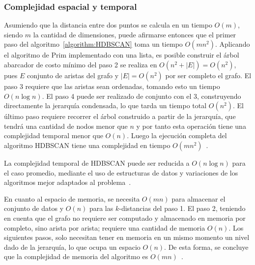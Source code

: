 \subsubsection{Complejidad espacial y temporal}

Asumiendo que la distancia entre dos puntos se calcula en un tiempo $O(m)$, siendo $m$ la cantidad de dimensiones, puede afirmarse entonces que el primer paso del algoritmo~\ref{algorithm:HDBSCAN} toma un tiempo $O(m n^2)$.
Aplicando el algoritmo de Prim implementado con una lista, es posible construir el árbol abarcador de costo mínimo del paso 2 se realiza en $O(n^2+|E|) = O(n^2)$, pues $E$ conjunto de aristas del grafo y $|E|=O(n^2)$ por ser completo el grafo.
El paso 3 requiere que las aristas sean ordenadas, tomando esto un tiempo $O(n\log n)$.
El paso 4 puede ser realizado de conjunto con el 3, construyendo directamente la jerarquía condensada, lo que tarda un tiempo total $O(n^2)$.
El último paso requiere recorrer el árbol construido a partir de la jerarquía, que tendrá una cantidad de nodos menor que $n$ y por tanto esta operación tiene una complejidad temporal menor que $O(n)$.
Luego la ejecución completa del algoritmo HDBSCAN tiene una complejidad en tiempo $O(m n^2)$~\cite{Campello15}.

La complejidad temporal de HDBSCAN puede ser reducida a $O(n\log n)$ para el caso promedio, mediante el uso de estructuras de datos y variaciones de los algoritmos mejor adaptados al problema~\cite{McInnes17-2}.

En cuanto al espacio de memoria, se necesita $O(m n)$ para almacenar el conjunto de datos y $O(n)$ para las $k$-distancias del paso 1.
El paso 2, teniendo en cuenta que el grafo no requiere ser computado y almacenado en memoria por completo, sino arista por arista;
requiere una cantidad de memoria $O(n)$.
Los siguientes pasos, solo necesitan tener en memoria en un mismo momento un nivel dado de la jerarquía, lo que ocupa un espacio $O(n)$.
De esta forma, se concluye que la complejidad de memoria del algoritmo es $O(m n)$~\cite{Campello15}.
